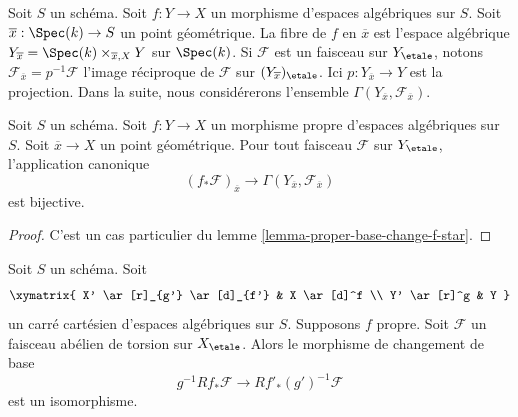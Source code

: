 \noindent
Soit $S$ un schéma.
Soit $f : Y \to X$ un morphisme d'espaces algébriques sur $S$. Soit
$\overline{x} : \Spec(k) \to S$ un point géométrique. La fibre
de $f$ en $\overline{x}$ est l'espace algébrique
$Y_{\overline{x}} = \Spec(k) \times_{\overline{x}, X} Y$ sur $\Spec(k)$.
Si $\mathcal{F}$ est un faisceau sur $Y_\etale$, notons
$\mathcal{F}_{\overline{x}} = p^{-1}\mathcal{F}$
l'image réciproque de $\mathcal{F}$ sur $(Y_{\overline{x}})_\etale$.
Ici $p : Y_{\overline{x}} \to Y$ est la projection.
Dans la suite, nous considérerons l'ensemble
$\Gamma(Y_{\overline{x}}, \mathcal{F}_{\overline{x}})$.

\begin{lemma}
\label{lemma-proper-pushforward-stalk}
Soit $S$ un schéma.
Soit $f : Y \to X$ un morphisme propre d'espaces algébriques sur $S$. Soit
$\overline{x} \to X$ un point géométrique.
Pour tout faisceau $\mathcal{F}$ sur $Y_\etale$,
l'application canonique
$$
(f_*\mathcal{F})_{\overline{x}} \longrightarrow
\Gamma(Y_{\overline{x}}, \mathcal{F}_{\overline{x}})
$$
est bijective.
\end{lemma}

\begin{proof}
C'est un cas particulier du lemme \ref{lemma-proper-base-change-f-star}.
\end{proof}

\begin{theorem}
\label{theorem-proper-base-change}
Soit $S$ un schéma. Soit
$$
\xymatrix{
X' \ar[r]_{g'} \ar[d]_{f'} & X \ar[d]^f \\
Y' \ar[r]^g & Y
}
$$
un carré cartésien d'espaces algébriques sur $S$.
Supposons $f$ propre.
Soit $\mathcal{F}$ un faisceau abélien de torsion sur $X_\etale$.
Alors le morphisme de changement de base
$$
g^{-1}Rf_*\mathcal{F} \longrightarrow Rf'_*(g')^{-1}\mathcal{F}
$$
est un isomorphisme.
\end{theorem}

